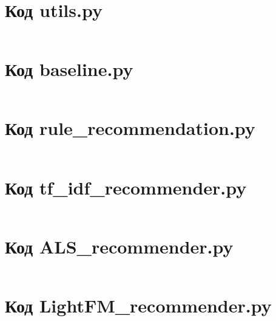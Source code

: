 \documentclass[bachelor, och, coursework]{SCWorks}
\begin{document}
\appendix

    \section{Код utils.py}
    \inputminted{py}{../src/models/utils/utils.py}

    \section{Код baseline.py}
    \inputminted{py}{../src/models/baseline.py}

    \section{Код rule_recommendation.py}
    \inputminted{py}{../src/models/ruleRecommendation.py}

    \section{Код tf_idf_recommender.py}
    \inputminted{py}{../src/models/TF-IDFRecommender.py}

    \section{Код ALS_recommender.py}
    \inputminted{py}{../src/models/ALSRecommender.py}

    \section{Код LightFM_recommender.py}
    \inputminted{py}{../src/models/LightFMRecommender.py}
\end{document}
